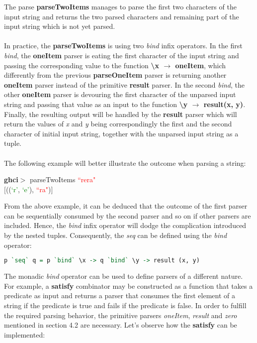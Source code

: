 \documentclass[a4paper, onecolumn]{article}
\begin{document}
    \noindent The parse \textbf{parseTwoItems} manages to parse the first two characters of the input string and returns the two parsed characters and remaining part of the input string which is not yet parsed. \\ \\
    In practice, the \textbf{parseTwoItems} is using two \textit{bind} infix operators. In the first \textit{bind}, the \textbf{oneItem} parser is eating the first character of the input string and passing the corresponding value to the function \textbf{\textbackslash x $\rightarrow$ oneItem}, which differently from the previous \textbf{parseOneItem} parser is returning another \textbf{oneItem} parser instead of the primitive \textbf{result} parser. In the second \textit{bind}, the  other \textbf{oneItem} parser is devouring the first character of the unparsed input string and passing that value as an input to the function \textbf{\textbackslash y $\rightarrow$ result(x, y)}. Finally, the resulting output will be handled by the \textbf{result} parser which will return the values of \textit{x} and \textit{y} being correspondingly the first and the second character of initial input string, together with the unparsed input string as a tuple. \\ \\ 
    The following example will better illustrate the outcome when parsing a string:
       \begin{center}
            \textbf{ghci$>$} parseTwoItems \textcolor{red}{``rera"} \\
            $\big[$((\textcolor{green}{`r'}, \textcolor{green}{`e'}), \textcolor{red}{``ra"})$\big]$
        \end{center}
        
    \noindent From the above example, it can be deduced that the outcome of the first parser can be sequentially consumed by the second parser and so on if other parsers are included. Hence, the \textit{bind} infix operator will dodge the complication introduced by the nested tuples. Consequently, the \textit{seq} can be defined using the \textit{bind} operator: 
    
    \begin{tcolorbox}
    \begin{lstlisting}[language=Haskell]
      p `seq` q = p `bind` \x -> q `bind` \y -> result (x, y)
    \end{lstlisting}
    \end{tcolorbox}
    
    \noindent The monadic \textit{bind} operator can be used to define parsers of a different nature. For example, a \textbf{satisfy} combinator may be constructed as a function that takes a predicate as input and returns a parser that consumes the first element of a string if the predicate is true and fails if the predicate is false. In order to fulfill the required parsing behavior, the primitive parsers \textit{oneItem}, \textit{result} and \textit{zero} mentioned in section 4.2 are necessary. Let's observe how the \textbf{satisfy} can be implemented: 
    
\end{document}

